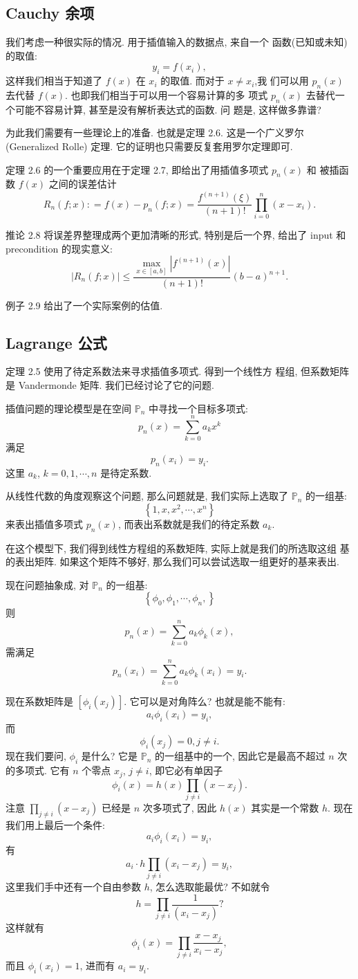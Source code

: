 \documentclass[a4paper]{ctexart}
\newcommand{\remark}[1]
{\noindent {\bf Remark {#1}}}
\begin{document}
\subsection{Cauchy 余项}
\remark{2.4} 我们考虑一种很实际的情况. 用于插值输入的数据点, 来自一个
函数(已知或未知)的取值:
$$
y_i = f(x_i),
$$
这样我们相当于知道了 $f(x)$ 在 $x_i$ 的取值. 而对于 $x \neq x_i$,我
们可以用 $p_n(x)$ 去代替 $f(x)$. 也即我们相当于可以用一个容易计算的多
项式 $p_n(x)$ 去替代一个可能不容易计算, 甚至是没有解析表达式的函数. 问
题是, 这样做多靠谱?

为此我们需要有一些理论上的准备. 也就是定理 2.6. 这是一个广义罗尔
(Generalized Rolle) 定理. 它的证明也只需要反复套用罗尔定理即可.

定理 2.6 的一个重要应用在于定理 2.7, 即给出了用插值多项式 $p_n(x)$ 和
被插函数 $f(x)$ 之间的误差估计
$$
R_n(f; x) : = f(x) - p_n(f; x)
= \frac{f^{(n + 1)}(\xi)}{(n + 1)!} \prod_{i = 0}^n (x - x_i).
$$

推论 2.8 将误差界整理成两个更加清晰的形式, 特别是后一个界, 给出了
input 和 precondition 的现实意义:
$$
|R_n(f; x)| \leq
\frac{\max_{x \in [a, b]}\left|f^{(n + 1)}(x)\right|}{(n + 1)!}(b - a)^{n + 1}.
$$

例子 2.9 给出了一个实际案例的估值.

\subsection{Lagrange 公式}
\remark{2.5} 定理 2.5 使用了待定系数法来寻求插值多项式. 得到一个线性方
程组, 但系数矩阵是 Vandermonde 矩阵. 我们已经讨论了它的问题.

插值问题的理论模型是在空间 $\mathbb{P}_n$ 中寻找一个目标多项式:
$$
p_n(x) = \sum_{k = 0}^n a_k x^k
$$
满足
$$
p_n(x_i) = y_i.
$$
这里 $a_k$, $k = 0, 1, \cdots, n$ 是待定系数.

从线性代数的角度观察这个问题, 那么问题就是, 我们实际上选取了
$\mathbb{P}_n$ 的一组基:
$$
\left\{1, x, x^2, \cdots, x^n\right\}
$$
来表出插值多项式 $p_n(x)$, 而表出系数就是我们的待定系数 $a_k$.

在这个模型下, 我们得到线性方程组的系数矩阵, 实际上就是我们的所选取这组
基的表出矩阵. 如果这个矩阵不够好, 那么我们可以尝试选取一组更好的基来表出.

现在问题抽象成, 对 $\mathbb{P}_n$ 的一组基:
$$
\left\{
\phi_0, \phi_1, \cdots, \phi_n,
\right\}
$$
则
$$
p_n(x) = \sum_{k = 0}^n a_k \phi_k(x),
$$
需满足
$$
p_n(x_i) = \sum_{k = 0}^n a_k \phi_k(x_i) = y_i.
$$

现在系数矩阵是 $\left[\phi_i(x_j)\right]$. 它可以是对角阵么? 也就是能不能有:
$$
a_i\phi_i(x_i) = y_i,
$$
而
$$
\phi_i(x_j) = 0, j \neq i.
$$
现在我们要问, $\phi_i$ 是什么? 它是 $\mathbb{P}_n$ 的一组基中的一个,
因此它是最高不超过 $n$ 次的多项式. 它有 $n$ 个零点 $x_j$, $j \neq i$,
即它必有单因子
$$
\phi_i(x) = h(x) \prod_{j \neq i}(x - x_j).
$$
注意 $\prod_{j \neq i}(x - x_j)$ 已经是 $n$ 次多项式了, 因此 $h(x)$
其实是一个常数 $h$. 现在我们用上最后一个条件:
$$
a_i\phi_i(x_i) = y_i,
$$
有
$$
a_i \cdot h \prod_{j \neq i}(x_i - x_j) = y_i,
$$
这里我们手中还有一个自由参数 $h$, 怎么选取能最优? 
不如就令
$$
h = \prod_{j \neq i}\frac{1}{(x_i - x_j)} ?
$$
这样就有
$$
\phi_i(x) = \prod_{j \neq i}\frac{x - x_j}{x_i - x_j}, 
$$
而且 $\phi_i(x_i) = 1$, 进而有 $a_i = y_i$.
\end{document}
